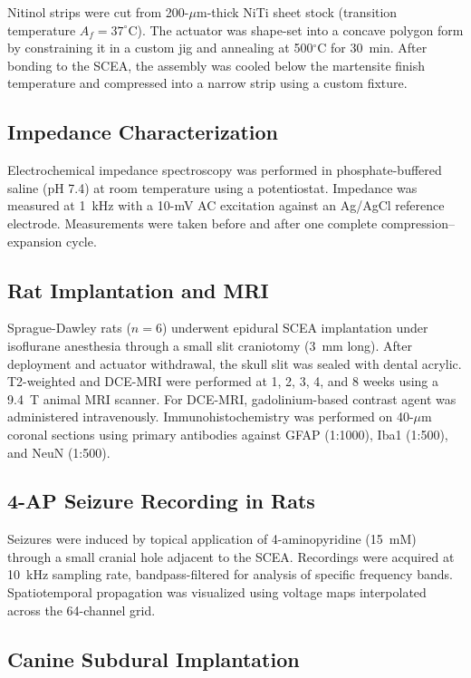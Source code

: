 \documentclass[11pt]{article}
\begin{document}
Nitinol strips were cut from 200-$\mu$m-thick NiTi sheet stock (transition temperature $A_f = 37^{\circ}$C). The actuator was shape-set into a concave polygon form by constraining it in a custom jig and annealing at 500$^{\circ}$C for 30~min. After bonding to the SCEA, the assembly was cooled below the martensite finish temperature and compressed into a narrow strip using a custom fixture.

\subsection{Impedance Characterization}

Electrochemical impedance spectroscopy was performed in phosphate-buffered saline (pH 7.4) at room temperature using a potentiostat. Impedance was measured at 1~kHz with a 10-mV AC excitation against an Ag/AgCl reference electrode. Measurements were taken before and after one complete compression--expansion cycle.

\subsection{Rat Implantation and MRI}

Sprague-Dawley rats ($n = 6$) underwent epidural SCEA implantation under isoflurane anesthesia through a small slit craniotomy (3~mm long). After deployment and actuator withdrawal, the skull slit was sealed with dental acrylic. T2-weighted and DCE-MRI were performed at 1, 2, 3, 4, and 8 weeks using a 9.4~T animal MRI scanner. For DCE-MRI, gadolinium-based contrast agent was administered intravenously. Immunohistochemistry was performed on 40-$\mu$m coronal sections using primary antibodies against GFAP (1:1000), Iba1 (1:500), and NeuN (1:500).

\subsection{4-AP Seizure Recording in Rats}

Seizures were induced by topical application of 4-aminopyridine (15~mM) through a small cranial hole adjacent to the SCEA. Recordings were acquired at 10~kHz sampling rate, bandpass-filtered for analysis of specific frequency bands. Spatiotemporal propagation was visualized using voltage maps interpolated across the 64-channel grid.

\subsection{Canine Subdural Implantation}
\end{document}
